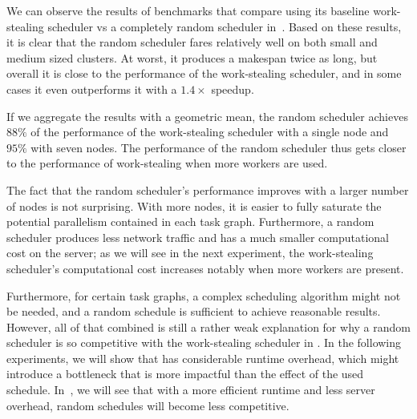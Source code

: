 We can observe the results of benchmarks that compare \dask{} using its
baseline work-stealing scheduler vs a completely random scheduler in~.
Based on these results, it is clear that the random scheduler fares relatively well on both small
and medium sized clusters. At worst, it produces a makespan twice as long, but overall it is close
to the performance of the work-stealing scheduler, and in some cases it even outperforms it with a
$1.4\times$ speedup.

If we aggregate the results with a geometric mean, the random scheduler achieves
$88\%$ of the performance of the work-stealing scheduler with a single node and
$95\%$ with seven nodes. The performance of the random scheduler thus gets
closer to the performance of work-stealing when more workers are used.

The fact that the random scheduler's performance improves with a larger number of nodes is not
surprising. With more nodes, it is easier to fully saturate the potential parallelism contained in
each task graph. Furthermore, a random scheduler produces less network traffic and has a much
smaller computational cost on the server; as we will see in the next experiment, the work-stealing
scheduler's computational cost increases notably when more workers are present.

Furthermore, for certain task graphs, a complex scheduling algorithm might not be needed, and a
random schedule is sufficient to achieve reasonable results. However, all of that combined is still
a rather weak explanation for why a random scheduler is so competitive with the work-stealing
scheduler in \dask{}. In the following experiments, we will show that
\dask{} has considerable runtime overhead, which might introduce a bottleneck
that is more impactful than the effect of the used schedule. In~, we
will see that with a more efficient runtime and less server overhead, random schedules will become
less competitive.


